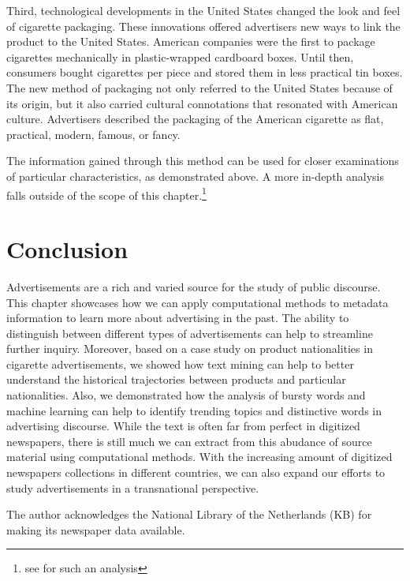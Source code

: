 \documentclass[USenglish]{article}
\begin{document}
Third, technological developments in the United States changed the look and
feel of cigarette packaging. These innovations offered advertisers new ways
to link the product to the United States. American companies were the
first to package cigarettes mechanically in plastic-wrapped cardboard
boxes. Until then, consumers bought cigarettes per piece and stored them
in less practical tin boxes. The new method of packaging not only referred
to the United States because of its origin, but it also carried cultural
connotations that resonated with American culture. Advertisers described
the packaging of the American cigarette as flat, practical, modern, famous, or fancy. 

The information gained through this method can be used for closer examinations of particular characteristics, as demonstrated above. A more in-depth analysis falls outside of the scope of this chapter.\footnote{see \cite{wevers_consuming_2017-1} for such an analysis}

\section{Conclusion}
Advertisements are a rich and varied source for the study of public discourse. This chapter showcases how we can apply computational methods to metadata information to learn more about advertising in the past. The ability to distinguish between different types of advertisements can help to streamline further inquiry. Moreover, based on a case study on product nationalities in cigarette advertisements, we showed how text mining can help to better understand the historical trajectories between products and particular nationalities. Also, we demonstrated how the analysis of bursty words and machine learning can help to identify trending topics and distinctive words in advertising discourse. While the text is often far from perfect in digitized newspapers, there is still much we can extract from this abudance of source material using computational methods. With the increasing amount of digitized newspapers collections in different countries, we can also expand our efforts to study advertisements in a transnational perspective.


\begin{acknowledgement}
The author acknowledges the National Library of the Netherlands (KB) for making its newspaper data available.

\end{acknowledgement}



\end{document}
